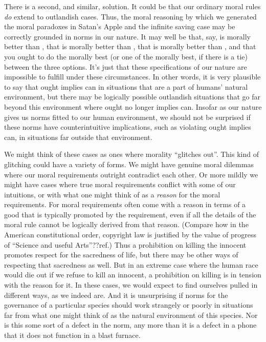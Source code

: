 There is a second, and similar, solution. It could be that our ordinary moral rules \textit{do} extend to outlandish
cases. Thus, the moral reasoning by which we generated the moral paradoxes in Satan's Apple and the 
infinite saving case may be correctly grounded in norms in our nature. It may well be that, say,
 is morally better than , that  is morally better than , 
that  is morally better than , and that you ought to do the morally best (or one
of the morally best, if there is a tie) between the three options. It's just that these specifications of 
our nature are impossible to fulfill under these circumstances. In other words, it is very plausible to
say that ought implies can in situations that are a part of humans' natural environment, but there may be
logically possible outlandish situations that go far beyond this environment where ought no longer implies can. 
Insofar as our nature gives us norms fitted to our human environment, we should not be surprised if these norms
have counterintuitive implications, such as violating ought implies can, in situations far outside that environment.

We might think of these cases as ones where morality ``glitches out''. This kind of glitching could have a variety
of forms. We might have genuine moral dilemmas where our moral requirements outright contradict each other. Or more
mildly we might have cases where true moral requirements conflict with some of our intuitions, or with what one might think of as a
\textit{reason} for the moral requirements. For moral requirements often come with a reason in terms of a good that
is typically promoted by the requirement, even if all the details of the moral rule cannot be logically derived from that reason.
(Compare how in the American constitutional order, copyright law is justified by the value of progress 
of ``Science and useful Arts''??ref.) Thus a prohibition on killing the innocent promotes respect for the sacredness of life,
but there may be other ways of respecting that sacredness as well. But in an extreme case where the human race would die out
if we refuse to kill an innocent, a prohibition on killing is in tension with the reason for it. In these cases, we would
expect to find ourselves pulled in different ways, as we indeed are. And it is unsurprising if norms for the governance of
a particular species should work strangely or poorly in situations far from what one might think of as the natural environment 
of this species. Nor is this some sort of a defect in the norm, any more than it is a defect in a phone that it does not
function in a blast furnace.

